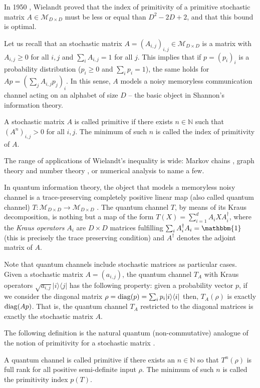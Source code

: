 \documentclass[smallextended]{svjour3}
\renewcommand{\1}{\mathbbm{1}}
\newcommand{\N}{\mathbb{N}}
\newcommand{\ket} [1] {\vert #1 \rangle}
\newcommand{\bra} [1] {\langle #1 \vert}
\begin{document}
In 1950 \cite{Wielandt}, Wielandt proved that the index of primitivity of a primitive stochastic matrix $A\in \mathcal{M}_{D\times D}$ must be less or equal than $D^2-2D+2$, and that this bound is optimal.

Let us recall that an stochastic matrix $A= (A_{i,j})_{i,j}\in \mathcal{M}_{D\times D}$ is a matrix with $A_{i,j}\ge 0$ for all $i,j$ and $\sum_{i} A_{i,j}=1$ for all $j$. This implies that if $p=(p_i)_i$ is a probability distribution ($p_i\ge 0$ and $\sum_i p_i=1$), the same holds for $Ap=(\sum_j A_{i,j}p_j)_i$. In this sense, $A$ models a noisy memoryless communication channel acting on an alphabet of size $D$ -- the basic object in Shannon's information theory.

A stochastic matrix $A$ is called primitive if there exists $n\in \N$ such that $(A^n)_{i,j}>0$ for all $i,j$. The minimum of such $n$ is called the index of primitivity of $A$.

The range of applications of Wielandt's inequality is wide: Markov chains \cite{Seneta}, graph theory and number theory \cite{Alfonsin}, or numerical analysis \cite{Varga} to name a few.

In quantum information theory, the object that models a memoryless noisy channel is a trace-preserving completely positive linear map (also called quantum channel) $T:\mathcal{M}_{D\times D} \rightarrow \mathcal{M}_{D\times D}$ \cite{NielsenChuang}. The quantum channel  $T$, by means of its Kraus decomposition, is nothing but a map of the form $T(X)=\sum_{i=1}^d A_i X A_i^{\dagger}$, where the {\it Kraus operators} $A_i$ are $D\times D$ matrices fulfilling $\sum_i A_i^{\dagger} A_i=\1$ (this is precisely the trace preserving condition) and $A^{\dagger}$ denotes the adjoint matrix of $A$.

Note that quantum channels include stochastic matrices as particular cases. Given a stochastic matrix $A=(a_{i,j})$, the quantum channel  $T_A$ with Kraus operators $\sqrt{a_{i,j}} \ket{i}\bra{j}$ has the following property: given a probability vector $p$, if we consider the diagonal matrix $\rho={\rm diag} (p)=\sum_i p_i \ket{i}\bra{i}$ then, $T_A(\rho)$ is exactly ${\rm diag} (Ap)$.  That is, the quantum channel $T_A$ restricted to the diagonal matrices is exactly the stochastic matrix $A$.

The following definition is the natural quantum (non-commutative) analogue of the notion of primitivity for a stochastic matrix \cite{qWielandt}.

\begin{definition}
    A quantum channel is called primitive if there exists an $n\in \N$ so that $T^n(\rho)$ is full rank for all positive semi-definite input $\rho$.   The minimum of such $n$ is called the primitivity index $p(T)$.
\end{definition}
\end{document}
